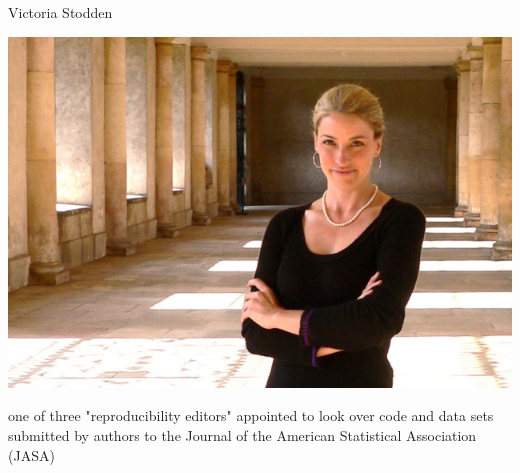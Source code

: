\documentclass[compress]{beamer}
\begin{document}
\begin{frame}{Victoria Stodden}
\begin{center}
\includegraphics[width=.6\columnwidth]{figures/victoria}

one of three "reproducibility editors" appointed to look over code and data sets submitted by authors to the Journal of the American Statistical Association (JASA)
\end{center}

\end{frame}
\end{document}
